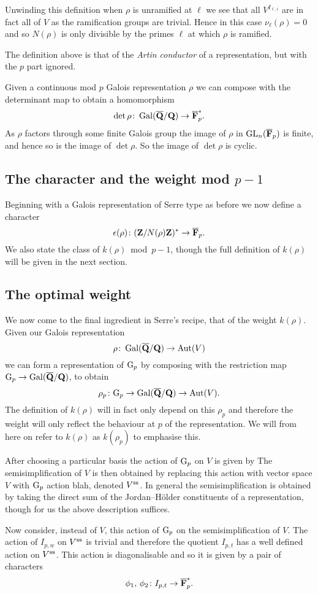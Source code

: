 \documentclass[a4paper,12pt]{article}
\begin{document}
Unwinding this definition when $\rho$ is unramified at $\ell$ we see that all $V^{I_{\ell,i}}$ are in fact all of $V$ as the ramification groups are trivial. %
Hence in this case $\nu_\ell(\rho) = 0$ and so $N(\rho)$ is only divisible by the primes $\ell$ at which $\rho$ is ramified.

The definition above is that of the \emph{Artin conductor} of a representation, but with the $p$ part ignored. %

Given a continuous mod $p$ Galois representation $\rho$ we can compose with the determinant map to obtain a homomorphism
\[
\det \rho\colon \operatorname{Gal}(\overline{\mathbf{Q}}/\mathbf{Q}) \to \overline{\mathbf{F}}_p^*.
\]
As $\rho$ factors through some finite Galois group the image of $\rho$ in $\operatorname{GL}_n(\overline{\mathbf{F}}_p)$ is finite, and hence so is the image of $\det \rho$.
So the image of $\det \rho$ is cyclic.


\subsection{The character and the weight mod $p-1$}
Beginning with a Galois representation of Serre type as before we now define a character
\[
\epsilon(\rho)\colon  (\mathbf{Z}/N(\rho)\mathbf{Z})^* \to \overline{\mathbf{F}}_p.
\]
We also state the class of $k(\rho)$~mod~$p-1$, though the full definition of $k(\rho)$ will be given in the next section.


\subsection{The optimal weight}
We now come to the final ingredient in Serre's recipe, that of the weight $k(\rho)$.
Given our Galois representation
\[
\rho \colon \operatorname{Gal}(\overline{\mathbf{Q}}/\mathbf{Q}) \to \operatorname{Aut}(V)
\]
we can form a representation of $\mathrm{G}_p$ by composing with the restriction map $\mathrm{G}_p \to\operatorname{Gal}(\overline{\mathbf{Q}}/\mathbf{Q})$, to obtain
\[
\rho_p\colon \mathrm{G}_p \to \operatorname{Gal}(\overline{\mathbf{Q}}/\mathbf{Q}) \to \operatorname{Aut}(V).
\]
The definition of $k(\rho)$ will in fact only depend on this $\rho_p$ and therefore the weight will only reflect the behaviour at $p$ of the representation.
We will from here on refer to $k(\rho)$ as $k(\rho_p)$ to emphasise this.

After choosing a particular basis the action of $\mathrm{G}_p$ on $V$ is given by 
The semisimplification of $V$ is then obtained by replacing this action with
vector space $V$ with $\mathrm{G}_p$ action blah, denoted $V^\text{ss}$. %
In general the semisimplification is obtained by taking the direct sum of the Jordan--H\"older constituents of a representation, though for us the above description suffices.

Now consider, instead of $V$, this action of $\mathrm{G}_p$ on the semisimplification of $V$.
The action of $I_{p,w}$ on $V^\text{ss}$ is trivial and therefore the quotient $I_{p,t}$ has a well defined action on $V^\text{ss}$.
This action is diagonalisable and so it is given by a pair of characters
\[
\phi_1,\,\phi_2\colon I_{p,t} \to \overline{\mathbf{F}}_p^*.
\]
\end{document}
